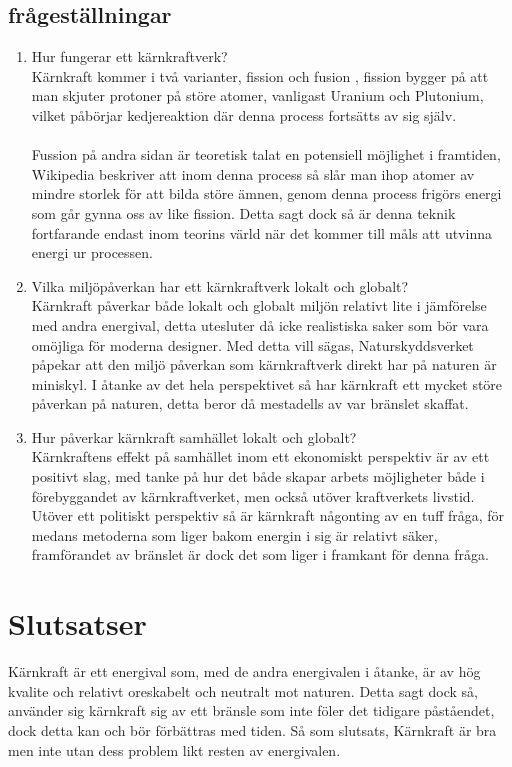 \documentclass[11pt]{article}
\begin{document}
    \subsection{frågeställningar}
    \begin{enumerate}
        \item Hur fungerar ett kärnkraftverk?\\
        Kärnkraft kommer i två varianter, fission \parencite{Fission} och fusion \parencite{Fusion} , fission bygger på att man skjuter protoner på störe atomer, vanligast Uranium och Plutonium, vilket påbörjar kedjereaktion där denna process fortsätts av sig själv.\\
        \\
        Fussion på andra sidan är teoretisk talat en potensiell möjlighet i framtiden, Wikipedia \parencite{Fusion} beskriver att inom denna process så slår man ihop atomer av mindre storlek för att bilda störe ämnen, genom denna process frigörs energi som går gynna oss av like fission. Detta sagt dock så är denna teknik fortfarande endast inom teorins värld när det kommer till måls att utvinna energi ur processen.
        \item Vilka miljöpåverkan har ett kärnkraftverk lokalt och globalt?\\
        Kärnkraft påverkar både lokalt och globalt miljön relativt lite i jämförelse med andra energival, detta utesluter då icke realistiska saker som bör vara omöjliga för moderna designer. Med detta vill sägas, Naturskyddsverket \parencite{Naturskyddsforeningen} påpekar att den miljö påverkan som kärnkraftverk direkt har på naturen är miniskyl. I åtanke av det hela perspektivet så har kärnkraft ett mycket störe påverkan på naturen, detta beror då mestadells av var bränslet skaffat.
        \item Hur påverkar kärnkraft samhället lokalt och globalt?\\
        Kärnkraftens effekt på samhället inom ett ekonomiskt perspektiv är av ett positivt slag, med tanke på hur det både skapar arbets möjligheter både i förebyggandet av kärnkraftverket, men också utöver kraftverkets livstid. Utöver ett politiskt perspektiv så är kärnkraft någonting av en tuff fråga, för medans metoderna som liger bakom energin i sig är relativt säker, framförandet av bränslet är dock det som liger i framkant för denna fråga.
    \end{enumerate}

    \section{Slutsatser}
    Kärnkraft är ett energival som, med de andra energivalen i åtanke, är av hög kvalite och relativt oreskabelt och neutralt mot naturen. Detta sagt dock så, använder sig kärnkraft sig av ett bränsle som inte föler det tidigare påståendet, dock detta kan och bör förbättras med tiden. Så som slutsats, Kärnkraft är bra men inte utan dess problem likt resten av energivalen.

    \printbibliography
\end{document}
